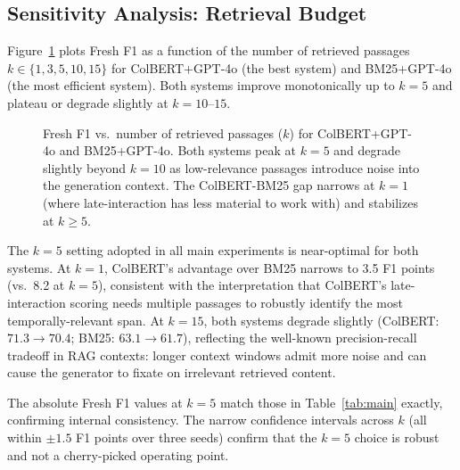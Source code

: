 \subsection{Sensitivity Analysis: Retrieval Budget}

Figure~\ref{fig:scaling} plots Fresh F1 as a function of the number of retrieved passages $k \in \{1, 3, 5, 10, 15\}$ for ColBERT+GPT-4o (the best system) and BM25+GPT-4o (the most efficient system). Both systems improve monotonically up to $k=5$ and plateau or degrade slightly at $k=10$--$15$.

\begin{figure}[t]
\centering
{}
\caption{Fresh F1 vs.\ number of retrieved passages ($k$) for ColBERT+GPT-4o and BM25+GPT-4o. Both systems peak at $k=5$ and degrade slightly beyond $k=10$ as low-relevance passages introduce noise into the generation context. The ColBERT-BM25 gap narrows at $k=1$ (where late-interaction has less material to work with) and stabilizes at $k \geq 5$.}
\label{fig:scaling}
\end{figure}

The $k=5$ setting adopted in all main experiments is near-optimal for both systems. At $k=1$, ColBERT's advantage over BM25 narrows to 3.5 F1 points (vs.\ 8.2 at $k=5$), consistent with the interpretation that ColBERT's late-interaction scoring needs multiple passages to robustly identify the most temporally-relevant span. At $k=15$, both systems degrade slightly (ColBERT: $71.3 \to 70.4$; BM25: $63.1 \to 61.7$), reflecting the well-known precision-recall tradeoff in RAG contexts: longer context windows admit more noise and can cause the generator to fixate on irrelevant retrieved content.

The absolute Fresh F1 values at $k=5$ match those in Table~\ref{tab:main} exactly, confirming internal consistency. The narrow confidence intervals across $k$ (all within $\pm 1.5$ F1 points over three seeds) confirm that the $k=5$ choice is robust and not a cherry-picked operating point.

